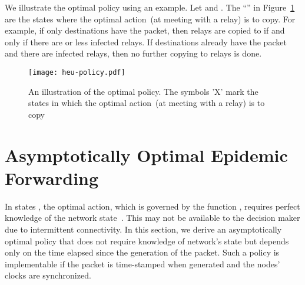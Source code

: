 \documentclass[10pt,journal,letterpaper]{IEEEtran}
\newtheorem{remarks}{Remarks}[section]
\newcommand{\remove}[1]{}
\begin{document}
\remove{
\begin{remarks}
\label{remark:Phi} Observe that  is decreasing in  for
a given  and also decreasing in  for a given . Thus the
optimal policy has the following properties.\\
\begin{inparaenum}[1)]
\item If , then  for all .\\
\item If , then  for all .
\end{inparaenum}

Thus the optimal solution can be given a ``stopping''
interpretation. More precisely, if the packet is not copied at a
meeting with a susceptible relay, it is not copied to relays in
future meetings. A priori however, we did not know if such a
``stopping'' was optimal.
\end{remarks}
}
\remove{
\begin{remarks}
Also observe that
 
 Hence

 Since phi is decreasing in m, we conclude that
\begin{enumerate}
\item  is convex in , and thus so is 
\item They are both submodular
\end{enumerate}
\end{remarks}
}

We illustrate the optimal policy using an example. Let  and . The
``'' in Figure~\ref{fig:heu-policy} are the
states where the optimal action~(at meeting with a relay) is to
copy. For example, if only  destinations have the packet, then
relays are copied to if and only if there are  or less infected
relays. If  destinations already have the packet and there are
 infected relays, then no further copying to relays is done.
\begin{figure}[t]{
\centering
\texttt{[image: heu-policy.pdf]}
\caption{An illustration of the optimal policy. The symbols 'X' mark
the states in which the optimal action~(at meeting with a relay) is
to copy}
 \label{fig:heu-policy}}
\end{figure}

\section{Asymptotically Optimal Epidemic Forwarding}
\label{asym-opt-forward}

In states , the optimal
action, which is governed by the function , requires
perfect knowledge of the network state~.
This may not be available to the decision maker due to intermittent
connectivity.
In this section, we derive an asymptotically optimal policy that
does not require knowledge of network's state but depends only on
the time elapsed since the generation of the packet. Such a policy
is implementable if the packet is time-stamped when generated and
the nodes' clocks are synchronized.
\end{document}
